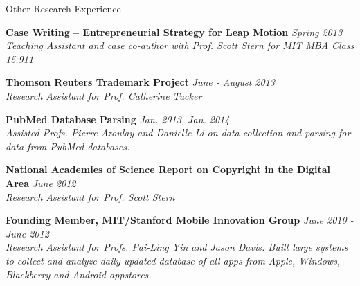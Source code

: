 \documentclass{resume} %
\begin{document}

\begin{rSection}{Other Research Experience}

{\bf Case Writing -- Entrepreneurial Strategy for Leap Motion} \emph{Spring 2013} \\
\emph{Teaching Assistant and case co-author with Prof. Scott Stern for MIT MBA Class 15.911}

{\bf Thomson Reuters Trademark Project} \emph{June - August 2013} \\
\emph{Research Assistant for Prof. Catherine Tucker}

{\bf PubMed Database Parsing} \emph{Jan. 2013, Jan. 2014} \\
\emph{Assisted Profs. Pierre Azoulay and Danielle Li on data collection and parsing for data from PubMed databases. } 

{\bf National Academies of Science Report on Copyright in the Digital Area} \emph{June 2012} \\
\emph{Research Assistant for Prof. Scott Stern}

{\bf Founding Member, MIT/Stanford Mobile Innovation Group} \emph{June 2010 - June 2012} \\
\emph{Research Assistant for Profs. Pai-Ling Yin and Jason Davis. Built large systems to collect and analyze daily-updated database of all apps from Apple, Windows, Blackberry and Android appstores.} 

\end{rSection}

\end{document}
